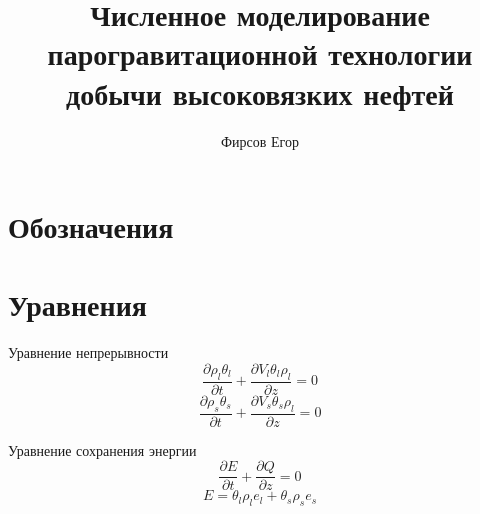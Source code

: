 \documentclass[12pt]{article}
\title{Численное моделирование парогравитационной технологии добычи высоковязких нефтей}
\author{Фирсов Егор}
\newcommand{\pd}[2]{\frac{\partial #1}{\partial #2}}
\begin{document}
\maketitle

\section*{Обозначения}

\section*{Уравнения}
Уравнение непрерывности
\begin{equation}
\pd{\rho_l\theta_l}{t} + \pd{V_l\theta_l\rho_l}{z} =0
\end{equation}
\begin{equation}
\pd{\rho_s\theta_s}{t} + \pd{V_s\theta_s\rho_l}{z} =0
\end{equation}

Уравнение сохранения энергии
\begin{equation}
\pd{E}{t} + \pd{Q}{z} =0 
\end{equation}
\begin{equation}
E=\theta_l\rho_l e_l + \theta_s\rho_s e_s 
\end{equation}
\end{document}
